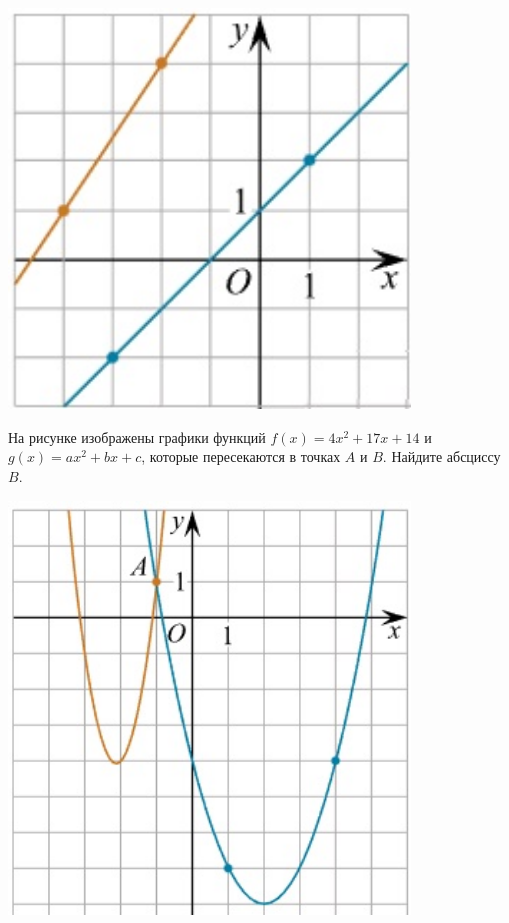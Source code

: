 \begin{listofex}
\begin{minipage}[c]{0.3\textwidth}
		\includegraphics[align=b, width=0.8\textwidth]{../pics/G111M3E-1}
	\end{minipage}
	\item \begin{minipage}[t]{0.66\textwidth}
		На рисунке изображены графики функций \( f(x)=4x^2+17x+14 \) и \( g(x)=ax^2+bx+c \), которые пересекаются в точках \(A\) и \(B\). Найдите абсциссу  \( B \).
	\end{minipage}
	\begin{minipage}[c]{0.3\textwidth}
		\includegraphics[align=b, width=0.8\textwidth]{../pics/G111M3E-2}
	\end{minipage}
\end{listofex}
%	
